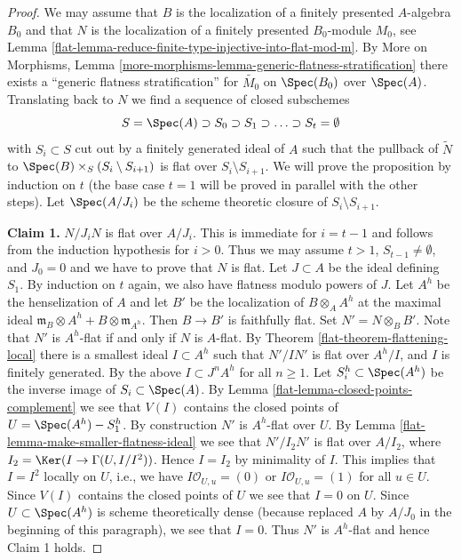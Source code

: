 \begin{proof}

We may assume that $B$ is the localization of a finitely presented
$A$-algebra $B_0$ and that $N$ is the localization of a
finitely presented $B_0$-module $M_0$, see
Lemma \ref{flat-lemma-reduce-finite-type-injective-into-flat-mod-m}.
By More on Morphisms, Lemma
\ref{more-morphisms-lemma-generic-flatness-stratification}
there exists a ``generic flatness stratification''
for $\widetilde{M_0}$ on $\Spec(B_0)$ over $\Spec(A)$.
Translating back to $N$ we find a sequence of closed subschemes
$$
S = \Spec(A) \supset S_0 \supset S_1 \supset \ldots \supset S_t = \emptyset
$$
with $S_i \subset S$ cut out by a finitely generated ideal of $A$
such that the pullback of $\widetilde{N}$ to
$\Spec(B) \times_S (S_i \setminus S_{i + 1})$ is flat over
$S_i \setminus S_{i + 1}$. We will prove the proposition by
induction on $t$ (the base case $t = 1$ will be proved in parallel
with the other steps). Let $\Spec(A/J_i)$ be the scheme theoretic
closure of $S_i \setminus S_{i + 1}$.

\medskip\noindent
{\bf Claim 1.} $N/J_iN$ is flat over $A/J_i$. This is immediate for
$i = t - 1$ and follows from the induction hypothesis for $i > 0$.
Thus we may assume $t > 1$, $S_{t - 1} \not = \emptyset$, and
$J_0 = 0$ and we have to prove that $N$ is flat. Let $J \subset A$
be the ideal defining $S_1$. By induction on $t$ again, we also
have flatness modulo powers of $J$. Let $A^h$ be the henselization of $A$
and let $B'$ be the localization of $B \otimes_A A^h$ at the maximal ideal
$\mathfrak m_B \otimes A^h + B \otimes \mathfrak m_{A^h}$. Then $B \to B'$
is faithfully flat. Set $N' = N \otimes_B B'$. Note that $N'$
is $A^h$-flat if and only if $N$ is $A$-flat. By
Theorem \ref{flat-theorem-flattening-local} there is a smallest ideal
$I \subset A^h$ such that $N'/IN'$ is flat over $A^h/I$, and
$I$ is finitely generated. By the above $I \subset J^nA^h$ for
all $n \geq 1$. Let $S_i^h \subset \Spec(A^h)$ be the inverse image
of $S_i \subset \Spec(A)$. By Lemma \ref{flat-lemma-closed-points-complement}
we see that $V(I)$ contains the closed points of $U = \Spec(A^h) - S_1^h$.
By construction $N'$ is $A^h$-flat over $U$.
By Lemma \ref{flat-lemma-make-smaller-flatness-ideal} we see that $N'/I_2N'$
is flat over $A/I_2$, where
$I_2 = \Ker(I \to \Gamma(U, I/I^2))$. Hence $I = I_2$ by minimality
of $I$. This implies that $I = I^2$ locally on $U$, i.e.,
we have $I\mathcal{O}_{U, u} = (0)$ or $I\mathcal{O}_{U, u} = (1)$
for all $u \in U$. Since $V(I)$ contains the closed points of $U$
we see that $I = 0$ on $U$. Since $U \subset \Spec(A^h)$ is scheme
theoretically dense (because replaced $A$ by $A/J_0$ in the beginning
of this paragraph), we see that $I = 0$. Thus $N'$ is $A^h$-flat
and hence Claim 1 holds.


\end{proof}
